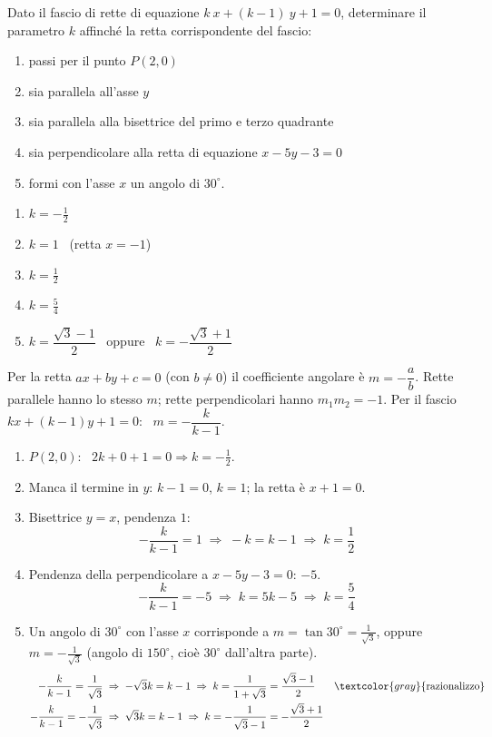 \begin{question}[ID=1.4, subtitle={Fascio $kx+(k-1)y+1=0$: determinazione di $k$}, tags={fascio di rette}, difficulty=facile]
Dato il fascio di rette di equazione $k\ x + (k-1) \ y +1 = 0$, determinare il parametro $k$ affinché la retta corrispondente del fascio:
\begin{enumerate}
    \item passi per il punto $P(2,0)$
    \item sia parallela all'asse $y$
    \item sia parallela alla bisettrice del primo e terzo quadrante
    \item sia perpendicolare alla retta di equazione $x-5y-3=0$
    \item formi con l'asse $x$ un angolo di $30^\circ$.
\end{enumerate}
\begin{solution}
\begin{enumerate}
    \item $k=-\tfrac12$
    \item $k=1$ \ (retta $x=-1$)
    \item $k=\tfrac12$
    \item $k=\tfrac54$
    \item $k=\dfrac{\sqrt3-1}{2}$ \ oppure \ $k=-\dfrac{\sqrt3+1}{2}$
\end{enumerate}
\end{solution}
\begin{explanation}
Per la retta $ax+by+c=0$ (con $b\neq0$) il coefficiente angolare è $m=-\dfrac ab$. Rette parallele hanno lo stesso $m$; rette perpendicolari hanno $m_1m_2=-1$.
Per il fascio $kx+(k-1)y+1=0$: \ $m=-\dfrac{k}{k-1}$.
\begin{enumerate}
    \item $P(2,0)$: \ $2k+0+1=0 \Rightarrow k=-\tfrac12$.
    \item Manca il termine in $y$: $k-1=0$, $k=1$; la retta è $x+1=0$.
    \item Bisettrice $y=x$, pendenza $1$:
    \[ -\dfrac{k}{k-1}=1 \;\Rightarrow\; -k=k-1 \;\Rightarrow\; k=\dfrac12 \]
    \item Pendenza della perpendicolare a $x-5y-3=0$: $-5$.
    \[ -\dfrac{k}{k-1}=-5 \;\Rightarrow\; k=5k-5 \;\Rightarrow\; k=\dfrac54 \]
    \item Un angolo di $30^\circ$ con l'asse $x$ corrisponde a $m=\tan30^\circ=\tfrac{1}{\sqrt3}$, oppure $m=-\tfrac1{\sqrt3}$ (angolo di $150^\circ$, cioè $30^\circ$ dall'altra parte).
    \[\begin{aligned}
    -\dfrac{k}{k-1}=\dfrac{1}{\sqrt3} &\;\Rightarrow\; -\sqrt3k=k-1 \;\Rightarrow\; k=\dfrac{1}{1+\sqrt3}=\dfrac{\sqrt3-1}{2} && \textcolor{gray}{\text{razionalizzo}}\\
    -\dfrac{k}{k-1}=-\dfrac{1}{\sqrt3} &\;\Rightarrow\; \sqrt3k=k-1 \;\Rightarrow\; k=-\dfrac{1}{\sqrt3-1}=-\dfrac{\sqrt3+1}{2}
    \end{aligned}\]
\end{enumerate}
\end{explanation}
\end{question}

